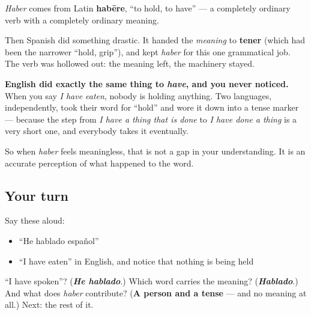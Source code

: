 \begin{cousinweb}
\emph{Haber} comes from Latin \textbf{habēre}, \textquotedblleft{}to hold, to have\textquotedblright{} — a completely ordinary verb with a completely ordinary meaning.

Then Spanish did something drastic. It handed the \emph{meaning} to \textbf{tener} (which had been the narrower \textquotedblleft{}hold, grip\textquotedblright{}), and kept \emph{haber} for this one grammatical job. The verb was hollowed out: the meaning left, the machinery stayed.

\textbf{English did exactly the same thing to \emph{have}, and you never noticed.} When you say \emph{I have eaten}, nobody is holding anything. Two languages, independently, took their word for \textquotedblleft{}hold\textquotedblright{} and wore it down into a tense marker — because the step from \emph{I have a thing that is done} to \emph{I have done a thing} is a very short one, and everybody takes it eventually.

So when \emph{haber} feels meaningless, that is not a gap in your understanding. It is an accurate perception of what happened to the word.
\end{cousinweb}

\subsection*{Your turn}
Say these aloud:

\begin{itemize}
\raggedright
  \item \textquotedblleft{}He hablado español\textquotedblright{}
  \item \textquotedblleft{}I have eaten\textquotedblright{} in English, and notice that nothing is being held
\end{itemize}

\begin{tcolorbox}[breakable,colback=teal!4,colframe=teal!35!black,title={Before you move on}]
\textquotedblleft{}I have spoken\textquotedblright{}? (\emph{\textbf{He hablado}}.) Which word carries the meaning? (\emph{\textbf{Hablado}}.) And what does \emph{haber} contribute? (\textbf{A person and a tense} — and no meaning at all.) Next: the rest of it.
\end{tcolorbox}
